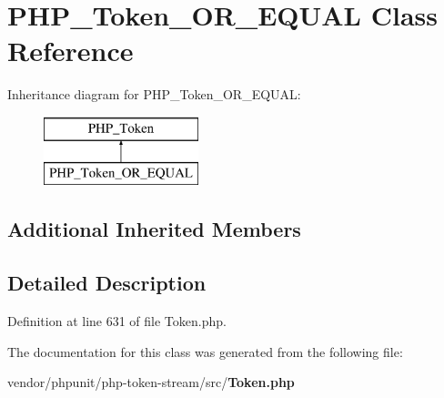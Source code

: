\section{P\+H\+P\+\_\+\+Token\+\_\+\+O\+R\+\_\+\+E\+Q\+U\+A\+L Class Reference}
\label{class_p_h_p___token___o_r___e_q_u_a_l}
Inheritance diagram for P\+H\+P\+\_\+\+Token\+\_\+\+O\+R\+\_\+\+E\+Q\+U\+A\+L\+:\begin{figure}[H]
\begin{center}
\leavevmode
\includegraphics[height=2.000000cm]{class_p_h_p___token___o_r___e_q_u_a_l}
\end{center}
\end{figure}
\subsection*{Additional Inherited Members}


\subsection{Detailed Description}


Definition at line 631 of file Token.\+php.



The documentation for this class was generated from the following file\+:\begin{DoxyCompactItemize}
\item 
vendor/phpunit/php-\/token-\/stream/src/{\bf Token.\+php}\end{DoxyCompactItemize}
